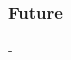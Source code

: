 \documentclass[a4paper, 10pt]{article}
\begin{document}
		\subsubsection{Future}
		
		-
		
		\renewcommand{\refname}{References}
		
		
			
			
			
			
			
			
		
		
		
		
		
	
\end{document}
